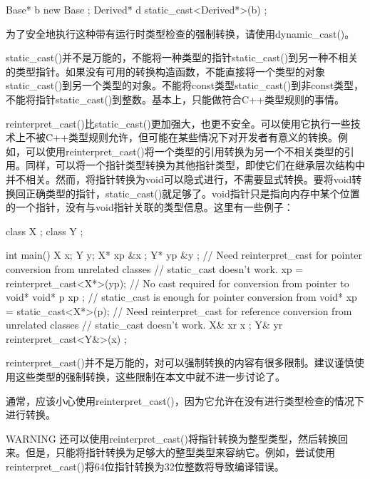 \begin{cpp}
Base* b { new Base {} };
Derived* d { static_cast<Derived*>(b) };
\end{cpp}

为了安全地执行这种带有运行时类型检查的强制转换，请使用dynamic\_cast()。

static\_cast()并不是万能的，不能将一种类型的指针static\_cast()到另一种不相关的类型指针。如果没有可用的转换构造函数，不能直接将一个类型的对象static\_cast()到另一个类型的对象。不能将const类型static\_cast()到非const类型，不能将指针static\_cast()到整数。基本上，只能做符合C++类型规则的事情。


reinterpret\_cast()比static\_cast()更加强大，也更不安全。可以使用它执行一些技术上不被C++类型规则允许，但可能在某些情况下对开发者有意义的转换。例如，可以使用reinterpret\_cast()将一个类型的引用转换为另一个不相关类型的引用。同样，可以将一个指针类型转换为其他指针类型，即使它们在继承层次结构中并不相关。然而，将指针转换为void可以隐式进行，不需要显式转换。要将void转换回正确类型的指针，static\_cast()就足够了。void指针只是指向内存中某个位置的一个指针，没有与void指针关联的类型信息。这里有一些例子：

\begin{cpp}
class X {};
class Y {};

int main()
{
    X x;
    Y y;
    X* xp { &x };
    Y* yp { &y };
    // Need reinterpret_cast for pointer conversion from unrelated classes
    // static_cast doesn't work.
    xp = reinterpret_cast<X*>(yp);
    // No cast required for conversion from pointer to void*
    void* p { xp };
    // static_cast is enough for pointer conversion from void*
    xp = static_cast<X*>(p);
    // Need reinterpret_cast for reference conversion from unrelated classes
    // static_cast doesn't work.
    X& xr { x };
    Y& yr { reinterpret_cast<Y&>(x) };
}
\end{cpp}

reinterpret\_cast()并不是万能的，对可以强制转换的内容有很多限制。建议谨慎使用这些类型的强制转换，这些限制在本文中就不进一步讨论了。

通常，应该小心使用reinterpret\_cast()，因为它允许在没有进行类型检查的情况下进行转换。

\begin{myWarning}{WARNING}
还可以使用reinterpret\_cast()将指针转换为整型类型，然后转换回来。但是，只能将指针转换为足够大的整型类型来容纳它。例如，尝试使用reinterpret\_cast()将64位指针转换为32位整数将导致编译错误。
\end{myWarning}

